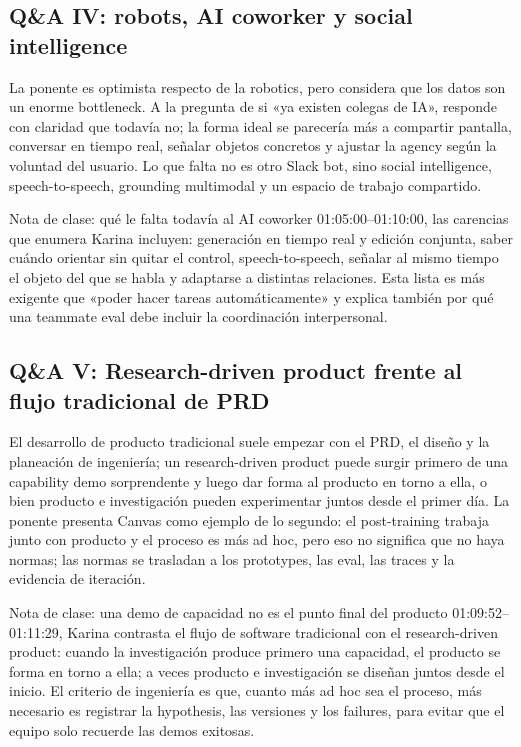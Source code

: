 \documentclass[a4paper]{article}
\begin{document}
\subsection{Q\&A IV: robots, AI coworker y social intelligence}

La ponente es optimista respecto de la robotics, pero considera que los datos son un enorme bottleneck. A la pregunta de si «ya existen colegas de IA», responde con claridad que todavía no; la forma ideal se parecería más a compartir pantalla, conversar en tiempo real, señalar objetos concretos y ajustar la agency según la voluntad del usuario. Lo que falta no es otro Slack bot, sino social intelligence, speech-to-speech, grounding multimodal y un espacio de trabajo compartido.

\begin{knowledgebox}{Nota de clase: qué le falta todavía al AI coworker}
01:05:00--01:10:00, las carencias que enumera Karina incluyen: generación en tiempo real y edición conjunta, saber cuándo orientar sin quitar el control, speech-to-speech, señalar al mismo tiempo el objeto del que se habla y adaptarse a distintas relaciones. Esta lista es más exigente que «poder hacer tareas automáticamente» y explica también por qué una teammate eval debe incluir la coordinación interpersonal.
\end{knowledgebox}

\subsection{Q\&A V: Research-driven product frente al flujo tradicional de PRD}

El desarrollo de producto tradicional suele empezar con el PRD, el diseño y la planeación de ingeniería; un research-driven product puede surgir primero de una capability demo sorprendente y luego dar forma al producto en torno a ella, o bien producto e investigación pueden experimentar juntos desde el primer día. La ponente presenta Canvas como ejemplo de lo segundo: el post-training trabaja junto con producto y el proceso es más ad hoc, pero eso no significa que no haya normas; las normas se trasladan a los prototypes, las eval, las traces y la evidencia de iteración.

\begin{importantbox}{Nota de clase: una demo de capacidad no es el punto final del producto}
01:09:52--01:11:29, Karina contrasta el flujo de software tradicional con el research-driven product: cuando la investigación produce primero una capacidad, el producto se forma en torno a ella; a veces producto e investigación se diseñan juntos desde el inicio. El criterio de ingeniería es que, cuanto más ad hoc sea el proceso, más necesario es registrar la hypothesis, las versiones y los failures, para evitar que el equipo solo recuerde las demos exitosas.
\end{importantbox}
\end{document}
